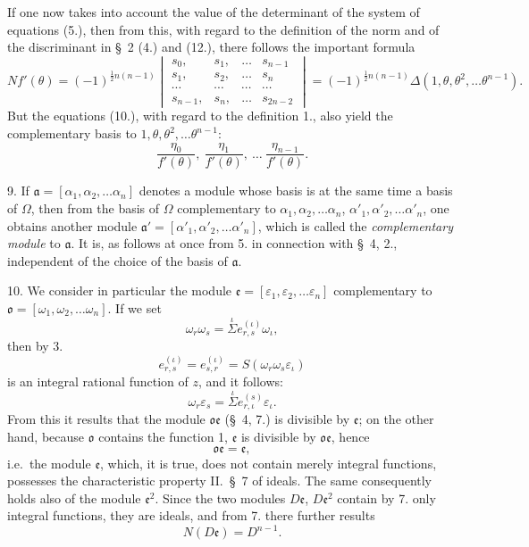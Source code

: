 \documentclass{article}
\begin{document}
If one now takes into account the value of the determinant of the system of equations (5.), then from this, with regard to the definition of the norm and of the discriminant in §~2 (4.) and (12.), there follows the important formula
\[ Nf'(\theta) = (-1)^{\frac{1}{2}n(n-1)} \begin{vmatrix} s_{0}, & s_{1}, & \ldots & s_{n-1} \\ s_{1}, & s_{2}, & \ldots & s_{n} \\ \cdots & \cdots & \cdots & \cdots \\ s_{n-1}, & s_{n}, & \ldots & s_{2n-2} \end{vmatrix} = (-1)^{\frac{1}{2}n(n-1)}\Delta(1, \theta, \theta^{2}, \ldots \theta^{n-1}). \tag{11.} \]
But the equations (10.), with regard to the definition 1., also yield the complementary basis to $1, \theta, \theta^{2}, \ldots \theta^{n-1}$:
\[ \frac{\eta_{0}}{f'(\theta)}, \ \frac{\eta_{1}}{f'(\theta)}, \ \ldots \ \frac{\eta_{n-1}}{f'(\theta)}. \]

9. If $\mathfrak{a} = [\alpha_{1}, \alpha_{2}, \ldots \alpha_{n}]$ denotes a module whose basis is at the same time a basis of $\Omega$, then from the basis of $\Omega$ complementary to $\alpha_{1}, \alpha_{2}, \ldots \alpha_{n}$, $\alpha'_{1}, \alpha'_{2}, \ldots \alpha'_{n}$, one obtains another module $\mathfrak{a}' = [\alpha'_{1}, \alpha'_{2}, \ldots \alpha'_{n}]$, which is called the \emph{complementary module} to $\mathfrak{a}$. It is, as follows at once from 5. in connection with §~4, 2., independent of the choice of the basis of $\mathfrak{a}$.

10. We consider in particular the module $\mathfrak{e} = [\varepsilon_{1}, \varepsilon_{2}, \ldots \varepsilon_{n}]$ complementary to $\mathfrak{o} = [\omega_{1}, \omega_{2}, \ldots \omega_{n}]$. If we set
\[ \omega_{r}\omega_{s} = \overset{\iota}{\Sigma} e_{r,s}^{(\iota)}\omega_{\iota}, \]
then by 3.
\[ e_{r,s}^{(\iota)} = e_{s,r}^{(\iota)} = S(\omega_{r}\omega_{s}\varepsilon_{\iota}) \]
is an integral rational function of $z$, and it follows:
\[ \omega_{r}\varepsilon_{s} = \overset{\iota}{\Sigma} e_{r,\iota}^{(s)}\varepsilon_{\iota}. \]
From this it results that the module $\mathfrak{o}\mathfrak{e}$ (§~4, 7.) is divisible by $\mathfrak{e}$; on the other hand, because $\mathfrak{o}$ contains the function 1, $\mathfrak{e}$ is divisible by $\mathfrak{o}\mathfrak{e}$, hence
\[ \mathfrak{o}\mathfrak{e} = \mathfrak{e}, \]
i.e.\ the module $\mathfrak{e}$, which, it is true, does not contain merely integral functions, possesses the characteristic property II.\ §~7 of ideals. The same consequently holds also of the module $\mathfrak{e}^{2}$. Since the two modules $D\mathfrak{e}$, $D\mathfrak{e}^{2}$ contain by 7. only integral functions, they are ideals, and from 7. there further results
\[ N(D\mathfrak{e}) = D^{n-1}. \]
\end{document}
